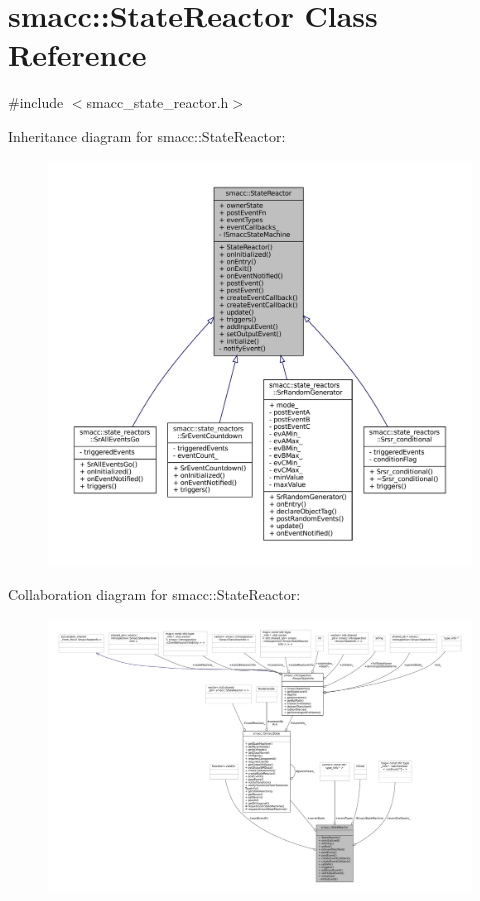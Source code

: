 \hypertarget{classsmacc_1_1StateReactor}{}\section{smacc\+:\+:State\+Reactor Class Reference}
\label{classsmacc_1_1StateReactor}


{\ttfamily \#include $<$smacc\+\_\+state\+\_\+reactor.\+h$>$}



Inheritance diagram for smacc\+:\+:State\+Reactor\+:
\nopagebreak
\begin{figure}[H]
\begin{center}
\leavevmode
\includegraphics[width=350pt]{classsmacc_1_1StateReactor__inherit__graph}
\end{center}
\end{figure}


Collaboration diagram for smacc\+:\+:State\+Reactor\+:
\nopagebreak
\begin{figure}[H]
\begin{center}
\leavevmode
\includegraphics[width=350pt]{classsmacc_1_1StateReactor__coll__graph}
\end{center}
\end{figure}
